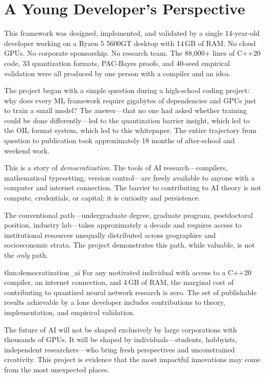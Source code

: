 \section{A Young Developer's Perspective}
\label{sec:perspective}

This framework was designed, implemented, and validated by a single 14-year-old developer working on a Ryzen 5 5600GT desktop with 14\,GB of RAM. No cloud GPUs. No corporate sponsorship. No research team. The 88,000+ lines of C++20 code, 33 quantization formats, PAC-Bayes proofs, and 40-seed empirical validation were all produced by one person with a compiler and an idea.

The project began with a simple question during a high-school coding project: why does every ML framework require gigabytes of dependencies and GPUs just to train a small model? The answer---that no one had asked whether training could be done differently---led to the quantization barrier insight, which led to the OIL format system, which led to this whitepaper. The entire trajectory from question to publication took approximately 18 months of after-school and weekend work.

This is a story of \textit{democratization}. The tools of AI research---compilers, mathematical typesetting, version control---are freely available to anyone with a computer and internet connection. The barrier to contributing to AI theory is not compute, credentials, or capital; it is curiosity and persistence.

The conventional path---undergraduate degree, graduate program, postdoctoral position, industry lab---takes approximately a decade and requires access to institutional resources unequally distributed across geographies and socioeconomic strata. The \MYTHOS{} project demonstrates this path, while valuable, is not the \textit{only} path.

\begin{mythm}{thm:democratization_ai}
For any motivated individual with access to a C++20 compiler, an internet connection, and 4\,GB of RAM, the marginal cost of contributing to quantized neural network research is zero. The set of publishable results achievable by a lone developer includes contributions to theory, implementation, and empirical validation.
\end{mythm}

The future of AI will not be shaped exclusively by large corporations with thousands of GPUs. It will be shaped by individuals---students, hobbyists, independent researchers---who bring fresh perspectives and unconstrained creativity. This project is evidence that the most impactful innovations may come from the most unexpected places.

